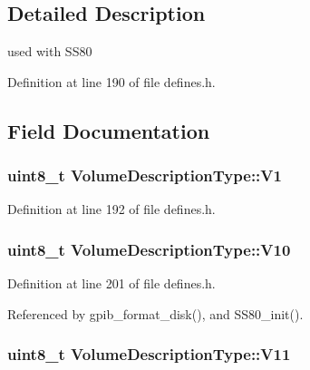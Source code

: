 \subsection{Detailed Description}
used with S\+S80 

Definition at line 190 of file defines.\+h.



\subsection{Field Documentation}
\subsubsection[{\texorpdfstring{V1}{V1}}]{\setlength{\rightskip}{0pt plus 5cm}uint8\+\_\+t Volume\+Description\+Type\+::\+V1}\hypertarget{structVolumeDescriptionType_a179b7af780dd2a93dcb095d12690f6fa}{}\label{structVolumeDescriptionType_a179b7af780dd2a93dcb095d12690f6fa}


Definition at line 192 of file defines.\+h.

\subsubsection[{\texorpdfstring{V10}{V10}}]{\setlength{\rightskip}{0pt plus 5cm}uint8\+\_\+t Volume\+Description\+Type\+::\+V10}\hypertarget{structVolumeDescriptionType_ac75ed59ba452ed86278e43e6fc5adec1}{}\label{structVolumeDescriptionType_ac75ed59ba452ed86278e43e6fc5adec1}


Definition at line 201 of file defines.\+h.



Referenced by gpib\+\_\+format\+\_\+disk(), and S\+S80\+\_\+init().

\subsubsection[{\texorpdfstring{V11}{V11}}]{\setlength{\rightskip}{0pt plus 5cm}uint8\+\_\+t Volume\+Description\+Type\+::\+V11}\hypertarget{structVolumeDescriptionType_ad9ead8ed6e1eff85d9f1fde20c0ba60d}{}\label{structVolumeDescriptionType_ad9ead8ed6e1eff85d9f1fde20c0ba60d}


